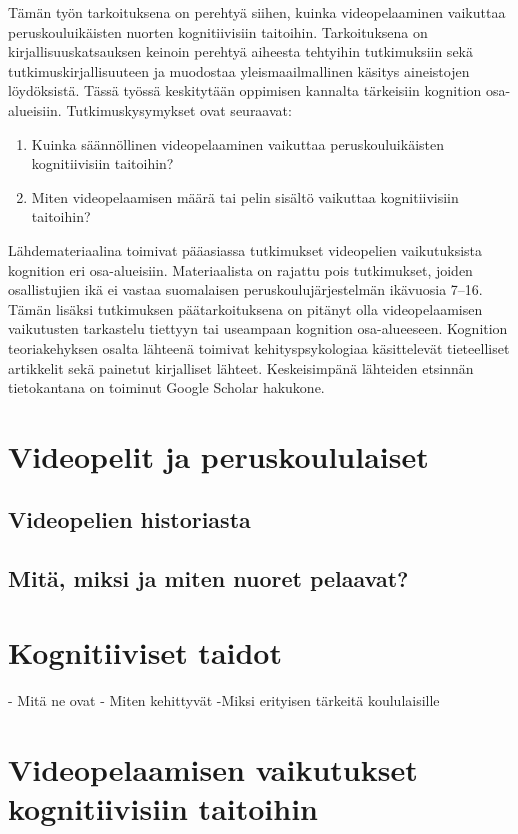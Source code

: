 \documentclass[utf8,bachelor]{gradu3}
\begin{document}
Tämän työn tarkoituksena on perehtyä siihen, kuinka videopelaaminen vaikuttaa peruskouluikäisten nuorten kognitiivisiin taitoihin. Tarkoituksena on kirjallisuuskatsauksen keinoin perehtyä aiheesta tehtyihin tutkimuksiin sekä tutkimuskirjallisuuteen ja muodostaa yleismaailmallinen käsitys aineistojen löydöksistä. Tässä työssä keskitytään oppimisen kannalta tärkeisiin kognition osa-alueisiin. Tutkimuskysymykset ovat seuraavat: 
\newpage
\begin{enumerate}
\item Kuinka säännöllinen videopelaaminen vaikuttaa peruskouluikäisten kognitiivisiin taitoihin? 
\item Miten videopelaamisen määrä tai pelin sisältö vaikuttaa kognitiivisiin taitoihin? 
\end{enumerate}

Lähdemateriaalina toimivat pääasiassa tutkimukset videopelien vaikutuksista kognition eri osa-alueisiin. Materiaalista on rajattu pois tutkimukset, joiden osallistujien ikä ei vastaa suomalaisen peruskoulujärjestelmän ikävuosia 7–16. Tämän lisäksi tutkimuksen päätarkoituksena on pitänyt olla videopelaamisen vaikutusten tarkastelu tiettyyn tai useampaan kognition osa-alueeseen. Kognition teoriakehyksen osalta lähteenä toimivat kehityspsykologiaa käsittelevät tieteelliset artikkelit sekä painetut kirjalliset lähteet.  Keskeisimpänä lähteiden etsinnän tietokantana on toiminut Google Scholar hakukone.  

\chapter{Videopelit ja peruskoululaiset}

\section{Videopelien historiasta}

\section{Mitä, miksi ja miten nuoret pelaavat?}

\chapter{Kognitiiviset taidot}
- Mitä ne ovat
- Miten kehittyvät
-Miksi erityisen tärkeitä koululaisille

\chapter{Videopelaamisen vaikutukset kognitiivisiin taitoihin}
\end{document}
